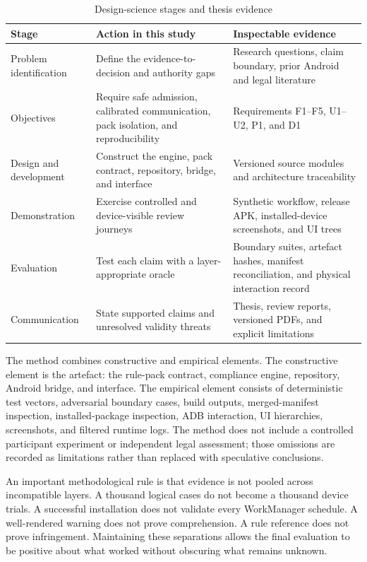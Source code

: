 \begin{table}[H]
\centering
\caption{Design-science stages and thesis evidence}
\label{tab:dsr-method-map}
\small
\begin{tabular}{>{\raggedright\arraybackslash}p{}>{\raggedright\arraybackslash}p{}>{\raggedright\arraybackslash}p{}}
\toprule
Stage & Action in this study & Inspectable evidence \\
\midrule
Problem identification & Define the evidence-to-decision and authority gaps & Research questions, claim boundary, prior Android and legal literature \\
Objectives & Require safe admission, calibrated communication, pack isolation, and reproducibility & Requirements F1--F5, U1--U2, P1, and D1 \\
Design and development & Construct the engine, pack contract, repository, bridge, and interface & Versioned source modules and architecture traceability \\
Demonstration & Exercise controlled and device-visible review journeys & Synthetic workflow, release APK, installed-device screenshots, and UI trees \\
Evaluation & Test each claim with a layer-appropriate oracle & Boundary suites, artefact hashes, manifest reconciliation, and physical interaction record \\
Communication & State supported claims and unresolved validity threats & Thesis, review reports, versioned PDFs, and explicit limitations \\
\bottomrule
\end{tabular}
\end{table}

The method combines constructive and empirical elements. The constructive element is the artefact: the rule-pack contract, compliance engine, repository, Android bridge, and interface. The empirical element consists of deterministic test vectors, adversarial boundary cases, build outputs, merged-manifest inspection, installed-package inspection, ADB interaction, UI hierarchies, screenshots, and filtered runtime logs. The method does not include a controlled participant experiment or independent legal assessment; those omissions are recorded as limitations rather than replaced with speculative conclusions.

An important methodological rule is that evidence is not pooled across incompatible layers. A thousand logical cases do not become a thousand device trials. A successful installation does not validate every WorkManager schedule. A well-rendered warning does not prove comprehension. A rule reference does not prove infringement. Maintaining these separations allows the final evaluation to be positive about what worked without obscuring what remains unknown.


